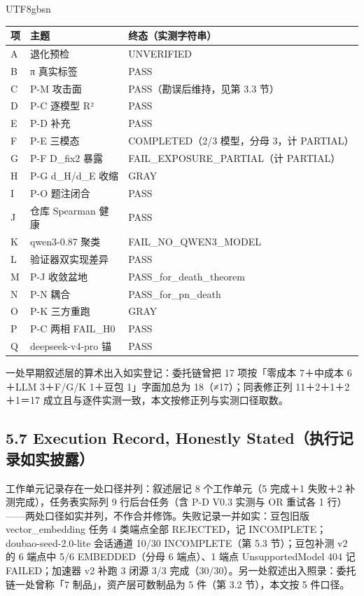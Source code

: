 \documentclass[10pt,a4paper]{article}
\begin{document}
\begin{CJK}{UTF8}{gbsn}
\begin{longtable}{>{\raggedright\arraybackslash}p{16pt}>{\raggedright\arraybackslash}p{100pt}>{\raggedright\arraybackslash}p{288pt}}
\toprule
\textbf{项} & \textbf{主题} & \textbf{终态（实测字符串）} \\
\midrule
\endhead
A & 退化预检 & UNVERIFIED \\
B & π 真实标签 & PASS \\
C & P-M 攻击面 & PASS（勘误后维持，见第 3.3 节） \\
D & P-C 逐模型 R² & PASS \\
E & P-D 补充 & PASS \\
F & P-E 三模态 & COMPLETED（2/3 模型，分母 3，计 PARTIAL） \\
G & P-F D\_fix2 暴露 & FAIL\_EXPOSURE\_PARTIAL（计 PARTIAL） \\
H & P-G d\_H/d\_E 收缩 & GRAY \\
I & P-O 题注闭合 & PASS \\
J & 仓库 Spearman 健康 & PASS \\
K & qwen3-0.87 聚类 & FAIL\_NO\_QWEN3\_MODEL \\
L & 验证器双实现差异 & PASS \\
M & P-J 收敛盆地 & PASS\_for\_death\_theorem \\
N & P-N 耦合 & PASS\_for\_pn\_death \\
O & P-K 三方重跑 & GRAY \\
P & P-C 两相 FAIL\_H0 & PASS \\
Q & deepseek-v4-pro 锚 & PASS \\
\bottomrule
\end{longtable}

一处早期叙述层的算术出入如实登记：委托链曾把 17 项按「零成本 7＋中成本 6＋LLM 3＋F/G/K 1＋豆包 1」字面加总为 18（≠17）；同表修正列 11＋2＋1＋2＋1＝17 成立且与逐件实测一致，本文按修正列与实测口径取数。

\subsection*{5.7 Execution Record, Honestly Stated（执行记录如实披露）}工作单元记录存在一处口径并列：叙述层记 8 个工作单元（5 完成＋1 失败＋2 补测完成），任务表实际列 9 行后台任务（含 P-D V0.3 实测与 OR 重试各 1 行）——两处口径如实并列，不作合并修饰。失败记录一并如实：豆包旧版 vector\_embedding 任务 4 类端点全部 REJECTED，记 INCOMPLETE；doubao-seed-2.0-lite 会话通道 10/30 INCOMPLETE（第 5.3 节）；豆包补测 v2 的 6 端点中 5/6 EMBEDDED（分母 6 端点）、1 端点 UnsupportedModel 404 记 FAILED；加速器 v2 补跑 3 闭源 3/3 完成（30/30）。另一处叙述出入照录：委托链一处曾称「7 制品」，资产层可数制品为 5 件（第 3.2 节），本文按 5 件口径。



\end{CJK}
\end{document}
